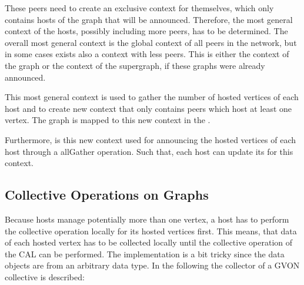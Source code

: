 These peers need to create an exclusive context for
themselves, which only contains hosts of the graph that will be
announced.  Therefore, the most general context of the hosts, possibly
including more peers, has to be determined.  The overall most general
context is the global context of all peers in the network, but in some
cases exists also a context with less peers.  This is either the
context of the graph or the context of the supergraph, if these graphs
were already announced.

This most general context is used to gather the number of hosted
vertices of each host and to create new context that only contains
peers which host at least one vertex. The graph is mapped to this new
context in the .

Furthermore, is this new context used for announcing the hosted
vertices of each host through a allGather operation. Such that,
each host can update its  for this context.

\subsection{Collective Operations on Graphs}
\label{sec:gvon_collective}

Because hosts manage potentially more than one vertex, a host has to
perform the collective operation locally for its hosted vertices
first. This means, that data of each hosted vertex has to be collected
locally until the collective operation of the CAL can be performed.
The implementation is a bit tricky since the data objects are from an
arbitrary data type. In the following the collector of a GVON
collective is described:


